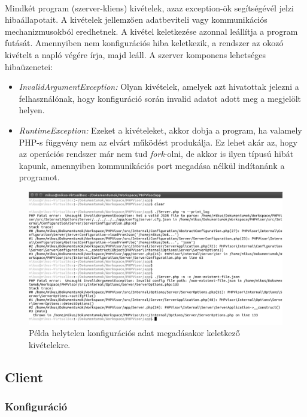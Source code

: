 \documentclass[12pt]{report}
\begin{document}
  \paragraph{}
 Mindkét program (szerver-kliens) kivételek, azaz exception-ök segítségévél jelzi hibaállapotait. A kivételek jellemzően adatbeviteli vagy kommunikációs mechanizmusokból eredhetnek.  A kivétel keletkezése azonnal leállítja a program futását. Amennyiben nem konfigurációs hiba keletkezik, a rendszer az okozó kivételt a napló végére írja, majd leáll.	
 A szerver komponens lehetséges hibaüzenetei:
 \begin{itemize}
 \item \textit{InvalidArgumentException:} Olyan kivételek, amelyek azt hivatottak jelezni a felhasználónak, hogy  konfiguráció során invalid adatot adott meg a megjelölt helyen. 
 \item \textit{RuntimeException:} Ezeket a kivételeket, akkor dobja a program, ha valamely PHP-s függvény nem az elvárt működést produkálja. Ez lehet akár az, hogy az operációs rendszer már nem tud \textit{fork}-olni, de akkor is ilyen típusú hibát kapunk, amennyiben kommunikációs port megadása nélkül indítanánk a programot.
 \end{itemize}
  \begin{figure}[ht]
  \centering
  \includegraphics[width=14cm]{pics/runerr.png}
	  \caption{Példa helytelen konfigurációs adat megadásakor keletkező kivételekre. \newline}
      \label{fig:runerr}
  \end{figure}
  
  \pagebreak
\subsection{Client}
\subsubsection{Konfiguráció}
\end{document}
